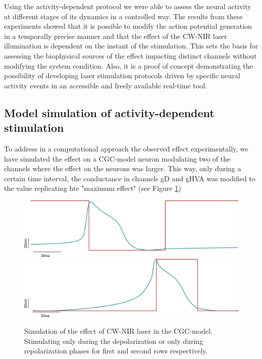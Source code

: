 Using the activity-dependent protocol we were able to assess the neural activity at different stages of its dynamics in a controlled way. The results from these experiments showed that it is possible to modify the action potential generation in a temporally precise manner and that the effect of the CW-NIR laser illumination is dependent on the instant of the stimulation. This sets the basis for assessing the biophysical sources of the effect impacting distinct channels without modifying the system condition. Also, it is a proof of concept demonstrating the possibility of developing laser stimulation protocols driven by specific neural activity events in an accessible and freely available real-time tool.

\subsection{Model simulation of activity-dependent stimulation}

To address in a computational approach the observed effect experimentally, we have simulated the effect on a CGC-model neuron modulating two of the channels where the effect on the neurons was larger. This way, only during a certain time interval, the conductance in channels gD and gHVA was modified to the value replicating hte "maximum effect" (see Figure \ref{fig:activity dependent model stimulation})

\begin{figure}[htb!]
	\includegraphics[width=\textwidth]{img/laser/activity-dependent-model/depol_model.png}
	\includegraphics[width=\textwidth]{img/laser/activity-dependent-model/repol_model.png}
	\caption{Simulation of the effect of CW-NIR laser in the CGC-model. Stimulating only during the depolarization or only during repolarization phases for first and second rows respectively.}
	\label{fig:activity dependent model stimulation}
\end{figure}

